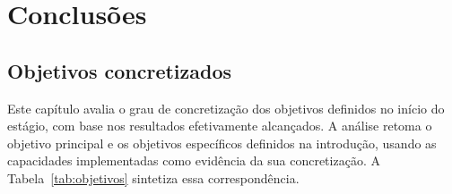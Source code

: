 \chapter{Conclusões}
\label{cap:conclusão}


\section{Objetivos concretizados}
\label{sec:objetivos_concretizados}

Este capítulo avalia o grau de concretização dos objetivos definidos no início do estágio, com base nos resultados efetivamente alcançados. A análise retoma o objetivo principal e os objetivos específicos definidos na introdução, usando as capacidades implementadas como evidência da sua concretização. A Tabela~\ref{tab:objetivos} sintetiza essa correspondência.

